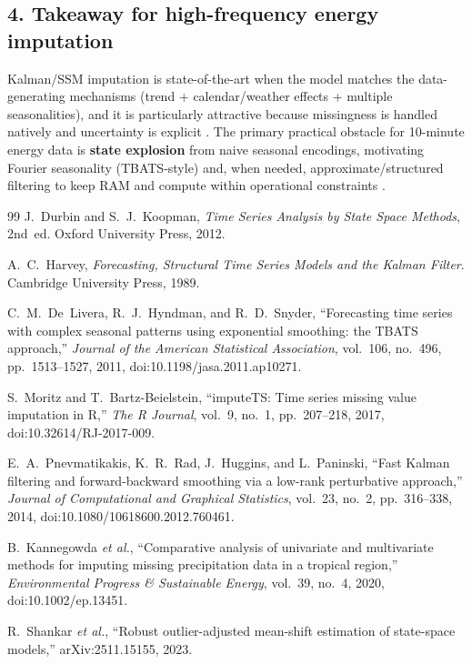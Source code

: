 \subsection*{4. Takeaway for high-frequency energy imputation}
Kalman/SSM imputation is state-of-the-art when the model matches the data-generating mechanisms (trend + calendar/weather effects + multiple seasonalities), and it is particularly attractive because missingness is handled natively and uncertainty is explicit \cite{durbin2012,harvey1989}. The primary practical obstacle for 10-minute energy data is \textbf{state explosion} from naive seasonal encodings, motivating Fourier seasonality (TBATS-style) and, when needed, approximate/structured filtering to keep RAM and compute within operational constraints \cite{delivera2011,pnevmatikakis2014}.

\begin{thebibliography}{99}
J.~Durbin and S.~J.~Koopman, \textit{Time Series Analysis by State Space Methods}, 2nd~ed. Oxford University Press, 2012.

A.~C.~Harvey, \textit{Forecasting, Structural Time Series Models and the Kalman Filter}. Cambridge University Press, 1989.

C.~M.~De~Livera, R.~J.~Hyndman, and R.~D.~Snyder, ``Forecasting time series with complex seasonal patterns using exponential smoothing: the TBATS approach,'' \textit{Journal of the American Statistical Association}, vol.~106, no.~496, pp.~1513--1527, 2011, doi:10.1198/jasa.2011.ap10271.

S.~Moritz and T.~Bartz-Beielstein, ``imputeTS: Time series missing value imputation in R,'' \textit{The R Journal}, vol.~9, no.~1, pp.~207--218, 2017, doi:10.32614/RJ-2017-009.

E.~A.~Pnevmatikakis, K.~R.~Rad, J.~Huggins, and L.~Paninski, ``Fast Kalman filtering and forward-backward smoothing via a low-rank perturbative approach,'' \textit{Journal of Computational and Graphical Statistics}, vol.~23, no.~2, pp.~316--338, 2014, doi:10.1080/10618600.2012.760461.

B.~Kannegowda \textit{et al.}, ``Comparative analysis of univariate and multivariate methods for imputing missing precipitation data in a tropical region,'' \textit{Environmental Progress & Sustainable Energy}, vol.~39, no.~4, 2020, doi:10.1002/ep.13451.

R.~Shankar \textit{et al.}, ``Robust outlier-adjusted mean-shift estimation of state-space models,'' arXiv:2511.15155, 2023.
\end{thebibliography}
